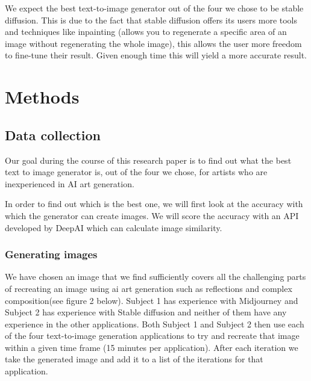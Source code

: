 \documentclass[]{report}
\begin{document}
\pagebreak

We expect the best text-to-image generator out of the four we chose to be stable diffusion. This is due to the fact that stable diffusion offers its users more tools and techniques like inpainting (allows you to regenerate a specific area of an image without regenerating the whole image), this allows the user more freedom to fine-tune their result. Given enough time this will yield a more accurate result.
	
\pagebreak
	
	\section{Methods}
	
	\subsection{Data collection}
	Our goal during the course of this research paper is to find out what the best text to image generator is, out of the four we chose, for artists who are inexperienced in AI art generation.
	
	In order to find out which is the best one, we will first look at the accuracy with which the generator can create images. We will score the accuracy with an API developed by DeepAI which can calculate image similarity.
	
	
	\subsubsection{Generating images}
	
	We have chosen an image that we find sufficiently covers all the challenging parts of recreating an image using ai art generation such as reflections and complex composition(see figure 2 below).
	Subject 1 has experience with Midjourney and Subject 2 has experience with Stable diffusion and neither of them have any experience in the other applications. Both Subject 1 and Subject 2 then use each of the four text-to-image generation applications to try and recreate that image within a given time frame (15 minutes per application). After each iteration we take the generated image and add it to a list of the iterations for that application. 
	
\end{document}

